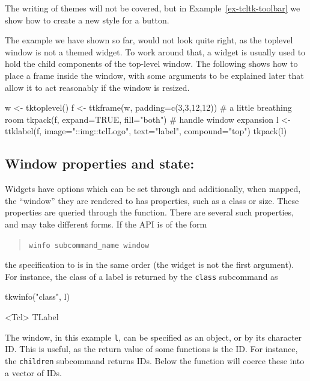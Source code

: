 The writing of themes will not be covered, but in Example~\ref{ex-tcltk-toolbar} we show how to create a new style for a button.

The example we have shown so far, would not look quite right, as the toplevel window is not a themed widget. To work around that, a  widget is usually used to hold the child components of the top-level window. The following shows how to place a frame inside the window, with some arguments to be explained later that allow it to act reasonably if the window is resized.
\begin{Schunk}
\begin{Sinput}
 w <- tktoplevel()
 f <- ttkframe(w, padding=c(3,3,12,12))  # a little breathing room
 tkpack(f, expand=TRUE, fill="both")     # handle window expansion
 l <- ttklabel(f, image="::img::tclLogo", text="label", compound="top")
 tkpack(l)
\end{Sinput}
\end{Schunk}

\subsection{Window properties and state: }
\label{sec:tcltk:overview:widget-properties}

Widgets have options which can be set through  and
additionally, when mapped, the ``window'' they are rendered to has
properties, such as a class or size. These properties are queried
through the  function.  There are several such
properties, and may take different forms. If the API is of the form

\begin{quotation}
\texttt{winfo subcommand\_name window}  
\end{quotation}
the specification to  is in the same order (the widget is not the first argument). For instance, the class of a label is returned by the \texttt{class} subcommand as

\begin{Schunk}
\begin{Sinput}
 tkwinfo("class", l)
\end{Sinput}
\begin{Soutput}
<Tcl> TLabel 
\end{Soutput}
\end{Schunk}

The window, in this example \texttt{l}, can be specified as an \R\/ object, or by its character ID. This is useful, as the return value of some functions is the ID. For instance, the \texttt{children} subcommand returns IDs. Below the  function will coerce these into a vector of IDs.

